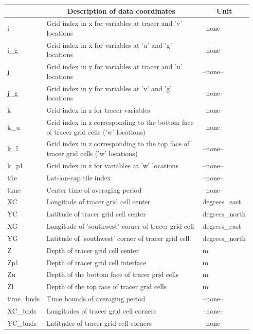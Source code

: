 \begin{longtable}{|m{}|m{}|m{}|}
\hline \endhead \hline \endfoot
\rowcolor{lightgray} \multicolumn{1}{|c|}{\textbf{Coordinates}} & \multicolumn{1}{|c|}{\textbf{Description of data coordinates}} &  \multicolumn{1}{|c|}{\textbf{Unit}}\\ \hline
i &Grid index in x for variables at tracer and 'v' locations &--none--  \\ \hline
i\_g &Grid index in x for variables at 'u' and 'g' locations &--none--  \\ \hline
j &Grid index in y for variables at tracer and 'u' locations &--none--  \\ \hline
j\_g &Grid index in y for variables at 'v' and 'g' locations &--none--  \\ \hline
k &Grid index in z for tracer variables &--none--  \\ \hline
k\_u &Grid index in z corresponding to the bottom face of tracer grid cells ('w' locations) &--none--  \\ \hline
k\_l &Grid index in z corresponding to the top face of tracer grid cells ('w' locations) &--none--  \\ \hline
k\_p1 &Grid index in z for variables at 'w' locations &--none--  \\ \hline
tile &Lat-lon-cap tile index &--none--  \\ \hline
time &Center time of averaging period &--none--  \\ \hline
XC &Longitude of tracer grid cell center &degrees\_east  \\ \hline
YC &Latitude of tracer grid cell center &degrees\_north  \\ \hline
XG &Longitude of 'southwest' corner of tracer grid cell &degrees\_east  \\ \hline
YG &Latitude of 'southwest' corner of tracer grid cell &degrees\_north  \\ \hline
Z &Depth of tracer grid cell center &m  \\ \hline
Zp1 &Depth of tracer grid cell interface &m  \\ \hline
Zu &Depth of the bottom face of tracer grid cells &m  \\ \hline
Zl &Depth of the top face of tracer grid cells &m  \\ \hline
time\_bnds &Time bounds of averaging period &--none--  \\ \hline
XC\_bnds &Longitudes of tracer grid cell corners &--none--  \\ \hline
YC\_bnds &Latitudes of tracer grid cell corners &--none--  \\ \hline

\end{longtable}
